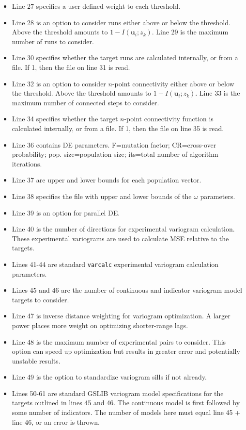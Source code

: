 \begin{itemize}[noitemsep]
   \item Line 27 specifies a user defined weight to each threshold.
   \item Line 28 is an option to consider runs either above or below the threshold. Above the threshold amounts to $1-I(\mathbf{u}_{i}; z_{k})$. Line 29 is the maximum number of runs to consider.
   \item Line 30 specifies whether the target runs are calculated internally, or from a file. If 1, then the file on line 31 is read.
   \item Line 32 is an option to consider $n$-point connectivity either above or below the threshold. Above the threshold amounts to $1-I(\mathbf{u}_{i}; z_{k})$. Line 33 is the maximum number of connected steps to consider.
   \item Line 34 specifies whether the target $n$-point connectivity function is calculated internally, or from a file. If 1, then the file on line 35 is read.
   \item Line 36 contains DE parameters. F=mutation factor; CR=cross-over probability; pop. size=population size; its=total number of algorithm iterations.
   \item Line 37 are upper and lower bounds for each population vector.
   \item Line 38 specifies the file with upper and lower bounds of the $\omega$ parameters.
   \item Line 39 is an option for parallel DE.
   \item Line 40 is the number of directions for experimental variogram calculation. These experimental variograms are used to calculate MSE relative to the targets.
   \item Lines 41-44 are standard \texttt{varcalc} experimental variogram calculation parameters.
   \item Lines 45 and 46 are the number of continuous and indicator variogram model targets to consider.
   \item Line 47 is inverse distance weighting for variogram optimization. A larger power places more weight on optimizing shorter-range lags.
   \item Line 48 is the maximum number of experimental pairs to consider. This option can speed up optimization but results in greater error and potentially unstable results.
   \item Line 49 is the option to standardize variogram sills if not already.
   \item Lines 50-61 are standard GSLIB variogram model specifications for the targets outlined in lines 45 and 46. The continuous model is first followed by some number of indicators. The number of models here must equal line 45 + line 46, or an error is thrown.
\end{itemize}



